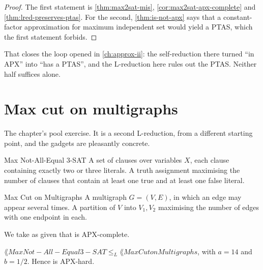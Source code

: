 \begin{proof}
The first statement is \cref{thm:max2sat-mis}, \cref{cor:max2sat-apx-complete}
and \cref{thm:lred-preserves-ptas}. For the second, \cref{thm:is-not-apx} says
that a constant-factor approximation for maximum independent set would yield a
PTAS, which the first statement forbids.
\end{proof}

That closes the loop opened in \cref{ch:approx-ii}: the self-reduction there
turned ``in APX'' into ``has a PTAS'', and the L-reduction here rules out the
PTAS. Neither half suffices alone.

\section{Max cut on multigraphs}
\label{sec:max-cut-apx}

The chapter's pool exercise. It is a second L-reduction, from a different
starting point, and the gadgets are pleasantly concrete.

\begin{probdef}{Max Not-All-Equal 3-SAT}
  \instance A set of clauses over variables $X$, each clause containing exactly
  two or three literals.
  \question A truth assignment maximising the number of clauses that contain at
  least one true and at least one false literal.
\end{probdef}

\begin{probdef}{Max Cut on Multigraphs}
  \instance A multigraph $G = (V,E)$, in which an edge may appear several
  times.
  \question A partition of $V$ into $V_1, V_2$ maximising the number of edges
  with one endpoint in each.
\end{probdef}

We take as given that  is APX-complete.

\begin{theorem}\label{thm:maxcut-apx-hard}
$\lang{Max Not-All-Equal 3-SAT} \le_L \lang{Max Cut on Multigraphs}$, with
$a = 14$ and $b = 1/2$. Hence  is APX-hard.
\end{theorem}

